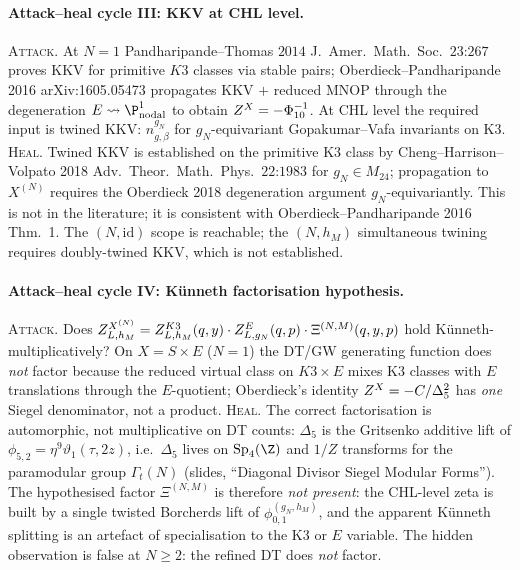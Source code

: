 \paragraph{Attack--heal cycle III: KKV at CHL level.}
\textsc{Attack.} At $N=1$ Pandharipande--Thomas $2014$
J.~Amer.~Math.~Soc.~$23$:$267$ proves KKV for primitive $K3$ classes
via stable pairs; Oberdieck--Pandharipande 2016 arXiv:1605.05473
propagates KKV $+$ reduced MNOP through the degeneration
$E\rightsquigarrow\P^{1}_{\mathrm{nodal}}$ to obtain $Z^{X}=-\Phi_{10}^{-1}$.
At CHL level the required input is twined KKV: $n^{g_N}_{g,\beta}$ for
$g_N$-equivariant Gopakumar--Vafa invariants on K3. \textsc{Heal.} Twined
KKV is established on the primitive K3 class by
Cheng--Harrison--Volpato 2018 Adv.~Theor.~Math.~Phys.~$22$:$1983$ for
$g_N\in M_{24}$; propagation to $X^{(N)}$ requires the Oberdieck 2018
degeneration argument $g_N$-equivariantly. This is not
in the literature; it is \ClaimStatusConjectured{} consistent with
Oberdieck--Pandharipande 2016 Thm.~1. The $(N,\mathrm{id})$ scope is
reachable; the $(N,h_M)$ simultaneous twining requires doubly-twined KKV,
which is not established.

\paragraph{Attack--heal cycle IV: K\"unneth factorisation hypothesis.}
\textsc{Attack.} Does $Z^{X^{(N)}}_{L, h_M}=Z^{K3}_{L,h_M}(q,y)\cdot Z^{E}_{L,g_N}(q,p)
\cdot\Xi^{(N,M)}(q,y,p)$ hold K\"unneth-multiplicatively? On $X=S\times E$
($N=1$) the DT/GW generating function does \emph{not} factor because
the reduced virtual class on $K3\times E$ mixes K3 classes with $E$
translations through the $E$-quotient; Oberdieck's identity
$Z^{X}=-C/\Delta_5^2$ has \emph{one} Siegel denominator, not a product.
\textsc{Heal.} The correct factorisation is automorphic, not
multiplicative on DT counts: $\Delta_5$ is the Gritsenko additive lift
of $\phi_{5,2}=\eta^9\vartheta_1(\tau,2z)$, i.e.\ $\Delta_5$ lives on
$\mathrm{Sp}_4(\Z)$ and $1/Z$ transforms for the paramodular group
$\Gamma_t(N)$ (slides, ``Diagonal Divisor Siegel Modular Forms''). The
hypothesised factor $\Xi^{(N,M)}$ is therefore \emph{not present}: the
CHL-level zeta is built by a single twisted Borcherds lift of
$\phi^{(g_N,h_M)}_{0,1}$, and the apparent Künneth splitting is an
artefact of specialisation to the K3 or $E$ variable. The hidden
observation is \ClaimStatusAxiomatic{} false at $N\geq 2$: the refined
DT does \emph{not} factor.

